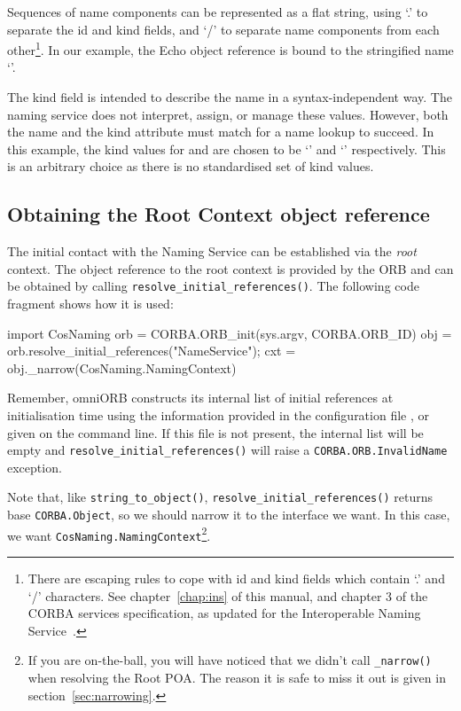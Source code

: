 \documentclass[11pt,oneside,a4paper]{book}
\newcommand{\type}[1]{\texttt{#1}}
\newcommand{\code}[1]{\texttt{#1}}
\newcommand{\op}[1]{\texttt{#1()}}
\newcommand{\term}[1]{\textit{#1}}
\newcommand{\dsc}{\discretionary{}{}{}}
\begin{document}
Sequences of name components can be represented as a flat string,
using `.' to separate the id and kind fields, and `/' to separate name
components from each other\footnote{There are escaping rules to cope
with id and kind fields which contain `.' and `/' characters. See
chapter~\ref{chap:ins} of this manual, and chapter 3 of the CORBA
services specification, as updated for the Interoperable Naming
Service~\cite{inschapters}.}. In our example, the Echo object
reference is bound to the stringified name
`'.

The kind field is intended to describe the name in a
syntax-independent way. The naming service does not interpret, assign,
or manage these values. However, both the name and the kind attribute
must match for a name lookup to succeed. In this example, the kind
values for  and  are chosen to be
`' and `' respectively. This is an
arbitrary choice as there is no standardised set of kind values.


\subsection{Obtaining the Root Context object reference}
\label{resolveinit}

The initial contact with the Naming Service can be established via the
\term{root} context. The object reference to the root context is
provided by the ORB and can be obtained by calling
\op{resolve\_initial\_references}. The following code fragment shows
how it is used:

\begin{pylisting}
import CosNaming
orb = CORBA.ORB_init(sys.argv, CORBA.ORB_ID)
obj = orb.resolve_initial_references("NameService");
cxt = obj._narrow(CosNaming.NamingContext)
\end{pylisting}

Remember, omniORB constructs its internal list of initial references
at initialisation time using the information provided in the
configuration file , or given on the command
line. If this file is not present, the internal list will be empty and
\op{resolve\_initial\_references} will raise a
\code{CORBA.ORB.\dsc{}InvalidName} exception.

Note that, like \op{string\_to\_object},
\op{resolve\_initial\_references} returns base \type{CORBA.Object}, so
we should narrow it to the interface we want. In this case, we want
\type{CosNaming.NamingContext}\footnote{If you are on-the-ball, you
will have noticed that we didn't call \op{\_narrow} when resolving the
Root POA. The reason it is safe to miss it out is given in
section~\ref{sec:narrowing}.}.
\end{document}

